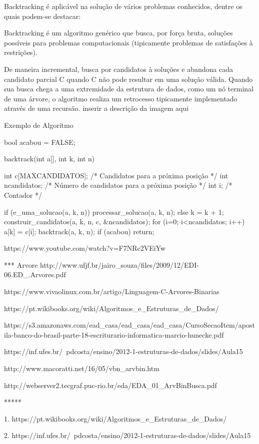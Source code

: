 \documentclass{article}
\begin{document}
Backtracking é aplicável na solução de vários problemas conhecidos, dentre os quais podem-se destacar:

Backtracking é um algoritmo genérico que busca, por força bruta, soluções possíveis para problemas computacionais (tipicamente problemas de satisfações à restrições).

De maneira incremental, busca por candidatos à soluções e abandona cada candidato parcial C quando C não pode resultar em uma solução válida.
Quando sua busca chega a uma extremidade da estrutura de dados, como um nó terminal de uma árvore, o algoritmo realiza um retrocesso tipicamente implementado através de uma recursão.
inserir a descrição da imagem aqui

Exemplo de Algoritmo

bool acabou = FALSE;

backtrack(int a[], int k, int n) {
    int c[MAXCANDIDATOS];  /* Candidatos para a próxima posição */
    int ncandidatos;       /* Número de candidatos para a próxima posição */
    int i;                 /* Contador */

    if (e_uma_solucao(a, k, n)) {
        processar_solucao(a, k, n);
    } else {
        k = k + 1;
        construir_candidatos(a, k, n, c, &ncandidatos);
        for (i=0; i<ncandidatos; i++) {
            a[k] = c[i];
            backtrack(a, k, n);
            if (acabou) return;
        }
    }
}

https://www.youtube.com/watch?v=F7NRc2VEiYw

*** Arvore
http://www.ufjf.br/jairo_souza/files/2009/12/EDI-06.ED_.Arvores.pdf

https://www.vivaolinux.com.br/artigo/Linguagem-C-Arvores-Binarias

https://pt.wikibooks.org/wiki/Algoritmos_e_Estruturas_de_Dados/%

https://s3.amazonaws.com/ead_casa/ead_casa/ead_casa/CursoSecaoItem/apostila-banco-do-brasil-parte-18-escriturario-informatica-marcio-hunecke.pdf

https://inf.ufes.br/~pdcosta/ensino/2012-1-estruturas-de-dados/slides/Aula15%

http://www.macoratti.net/16/05/vbn_arvbin.htm

http://webserver2.tecgraf.puc-rio.br/eda/EDA_01_ArvBinBusca.pdf

*****

1. https://pt.wikibooks.org/wiki/Algoritmos_e_Estruturas_de_Dados/%

2.
https://inf.ufes.br/~pdcosta/ensino/2012-1-estruturas-de-dados/slides/Aula15%
\end{document}
